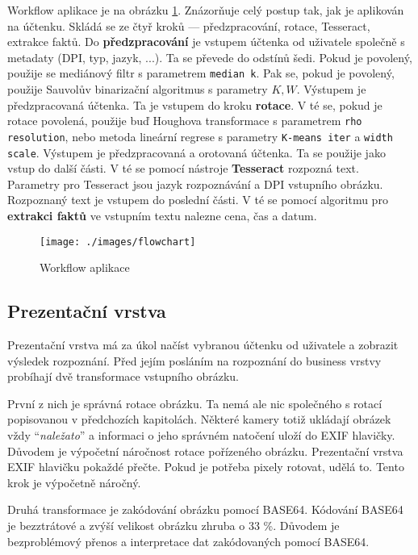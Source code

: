 \documentclass[thesis=B,czech]{FITthesis}[2019/12/23]
\def\myit#1{\texttt{#1}}
\begin{document}
Workflow aplikace je na obrázku \ref{fig:architecture}. Znázorňuje celý postup tak, jak je aplikován na účtenku. Skládá se ze čtyř kroků — předzpracování, rotace, Tesseract, extrakce faktů. Do \textbf{předzpracování} je vstupem účtenka od uživatele společně s metadaty (DPI, typ, jazyk, ...). Ta se převede do odstínů šedi. Pokud je povolený, použije se mediánový filtr s parametrem \myit{median k}. Pak se, pokud je povolený, použije Sauvolův binarizační algoritmus s parametry $K, W$. Výstupem je předzpracovaná účtenka. Ta je vstupem do kroku \textbf{rotace}. V té se, pokud je rotace povolená, použije buď Houghova transformace s parametrem \myit{rho resolution}, nebo metoda lineární regrese s parametry  \myit{K-means iter} a \myit{width scale}. Výstupem je předzpracovaná a orotovaná účtenka. Ta se použije jako vstup do další části. V té se pomocí nástroje \textbf{Tesseract} rozpozná text. Parametry pro Tesseract jsou jazyk rozpoznávání a DPI vstupního obrázku. Rozpoznaný text je vstupem do poslední části. V té se pomocí algoritmu pro \textbf{extrakci faktů} ve vstupním textu nalezne cena, čas a datum.

\begin{figure}[hb]
    \centering
    \texttt{[image: ./images/flowchart]}
    \caption{Workflow aplikace}
    \label{fig:architecture}
\end{figure}

\newpage
\subsection{Prezentační vrstva}
\label{sec:presentation-layer}
Prezentační vrstva má za úkol načíst vybranou účtenku od uživatele a zobrazit výsledek rozpoznání. Před jejím posláním na rozpoznání do business vrstvy probíhají dvě transformace vstupního obrázku.

První z nich je správná rotace obrázku. Ta nemá ale nic společného s rotací popisovanou v předchozích kapitolách. Některé kamery totiž ukládají obrázek vždy \enquote{\textit{naležato}} a informaci o jeho správném natočení uloží do EXIF hlavičky. Důvodem je výpočetní náročnost rotace pořízeného obrázku. Prezentační vrstva EXIF hlavičku pokaždé přečte. Pokud je potřeba pixely rotovat, udělá to. Tento krok je výpočetně náročný.

Druhá transformace je zakódování obrázku pomocí BASE64. Kódování BASE64 je bezztrátové a zvýší velikost obrázku zhruba o 33 \%. Důvodem je bezproblémový přenos a interpretace dat zakódovaných pomocí BASE64.
\end{document}

